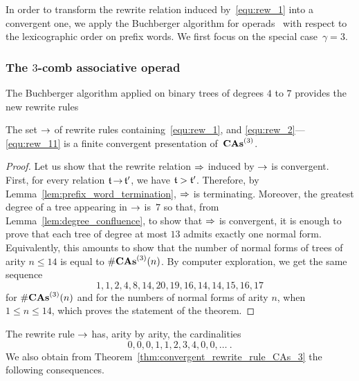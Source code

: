 In order to transform the rewrite relation induced by~\eqref{equ:rew_1}
into a convergent one, we apply the Buchberger algorithm for
operads~\cite[Section 3.7]{DK10} with respect to the lexicographic order
on prefix words. We first focus on the special case~$\gamma = 3$.
\medbreak

\subsubsection{The \texorpdfstring{$3$}{3}-comb associative operad}
\label{subsubsec:CAs_3}

The Buchberger algorithm applied on binary trees of degrees $4$ to $7$
provides the new rewrite rules \smallbreak

\medbreak

\begin{Theorem} \label{thm:convergent_rewrite_rule_CAs_3}
    The set $\operatorname{\to}$ of rewrite rules containing~\eqref{equ:rew_1},
    and \eqref{equ:rew_2}---\eqref{equ:rew_11} is a finite
    convergent presentation of~$\mathbf{CAs}^{\left(3\right)}$.
\end{Theorem}
\begin{proof}
    Let us show that the rewrite relation $\operatorname{\Rightarrow}$ induced by
    $\operatorname{\to}$ is convergent. First, for every relation $\mathfrak{t} \operatorname{\to} \mathfrak{t}'$,
    we have $\mathfrak{t} > \mathfrak{t}'$. Therefore, by
    Lemma~\ref{lem:prefix_word_termination}, $\operatorname{\Rightarrow}$ is
    terminating. Moreover, the greatest degree of a tree appearing in
    $\operatorname{\to}$ is~$7$ so that, from Lemma~\ref{lem:degree_confluence}, to
    show that $\operatorname{\Rightarrow}$ is convergent, it is enough to prove that
    each tree of degree at most $13$ admits exactly one normal form.
    Equivalently, this amounts to show that the number of normal forms
    of trees of arity $n\leq 14$ is equal to $\#\mathbf{CAs}^{\left(3\right)}(n)$. By computer
    exploration, we get the same sequence
    \begin{equation} \label{equ:dimensions_CAs_3}
        1, 1, 2, 4, 8, 14, 20, 19, 16, 14, 14, 15, 16, 17
    \end{equation}
    for $\#\mathbf{CAs}^{\left(3\right)}(n)$ and for the numbers of normal forms of arity $n$,
    when $ 1 \leq n \leq 14$, which proves the statement of the
    theorem.
\end{proof}
\medbreak

The rewrite rule $\operatorname{\to}$ has, arity by arity, the cardinalities
\begin{equation}
    0, 0, 0, 1, 1, 2, 3, 4, 0, 0, \dots~.
\end{equation}
We also obtain from Theorem~\ref{thm:convergent_rewrite_rule_CAs_3} the
following consequences.
\medbreak

